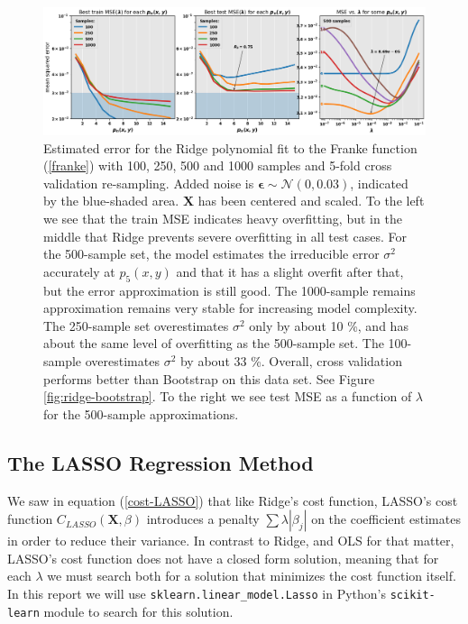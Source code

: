 \documentclass[]{article}
\begin{document}
\begin{figure}[!htb]
	\centering
	\includegraphics[width=1\linewidth]{./results/ridge-cv.png}
	\caption{Estimated error for the Ridge polynomial fit to the Franke function (\ref{franke}) with 100, 250, 500 and 1000 samples and 5-fold cross validation re-sampling. Added noise is $\mathbf{\epsilon} \sim \mathcal{N}(0, 0.03)$, indicated by the blue-shaded area. $\mathbf{X}$ has been centered and scaled. To the left we see that the train MSE indicates heavy overfitting, but in the middle that Ridge prevents severe overfitting in all test cases. For the 500-sample set, the model estimates the irreducible error $\sigma^2$ accurately at $p_5(x,y)$ and that it has a slight overfit after that, but the error approximation is still good. The 1000-sample remains approximation remains very stable for increasing model complexity. The 250-sample set overestimates $\sigma^2$ only by about 10 \%, and has about the same level of overfitting as the 500-sample set. The 100-sample overestimates $\sigma^2$ by about 33 \%. Overall, cross validation performs better than Bootstrap on this data set. See Figure \ref{fig:ridge-bootstrap}. To the right we see test MSE as a function of $\lambda$ for the 500-sample approximations.}
	\label{fig:ridge-cv}
\end{figure}

\subsection{The LASSO Regression Method}
We saw in equation (\ref{cost-LASSO}) that like Ridge's cost function, LASSO's cost function $C_{LASSO}(\mathbf{X},\mathbb{\beta})$ introduces a penalty $\sum \lambda |\beta_j|$ on the coefficient estimates in order to reduce their variance. In contrast to Ridge, and OLS for that matter, LASSO's cost function does not have a closed form solution, meaning that for each $\lambda$ we must search both for a solution that minimizes the cost function itself. In this report we will use \lstinline|sklearn.linear_model.Lasso| in Python's \lstinline|scikit-learn| module to search for this solution.
\end{document}
